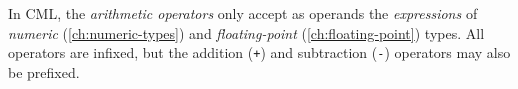 In CML, the \emph{arithmetic operators} only accept as operands
the \emph{expressions} of \emph{numeric} (\ref{ch:numeric-types})
and \emph{floating-point} (\ref{ch:floating-point}) types.
All operators are infixed,
but the addition (\verb|+|) and subtraction (\verb|-|) operators may also be prefixed.
